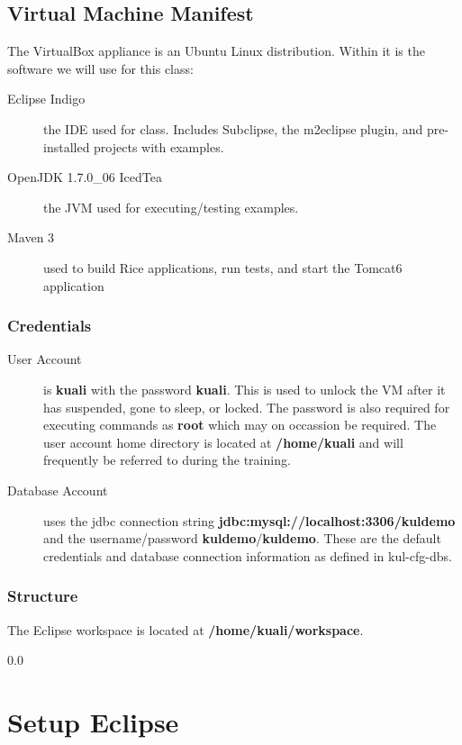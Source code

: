 \documentclass[12pt,notitlepage]{article}
\begin{document}
\subsection{Virtual Machine Manifest}
The VirtualBox appliance is an Ubuntu Linux distribution. Within it is
the software we will use for this class:
\begin{description}
  \item [Eclipse Indigo] the IDE used for class. Includes Subclipse,
    the m2eclipse plugin, and pre-installed projects with examples.
  \item [OpenJDK 1.7.0\_06 IcedTea] the JVM used for executing/testing
    examples.
  \item [Maven 3] used to build Rice applications, run tests, and
    start the Tomcat6 application
\end{description}

\subsubsection{Credentials}
\begin{description}
\item [User Account] is \textbf{kuali} with the password
  \textbf{kuali}. This is used to unlock the VM after it has suspended,
  gone to sleep, or locked. The password is also required for
  executing commands as \textbf{root} which may on occassion be
  required. The user account home directory is located at
  \textbf{/home/kuali} and will frequently be referred to during the training.
\item [Database Account] uses the jdbc connection string
  \textbf{jdbc:mysql://localhost:3306/kuldemo} and the
  username/password \textbf{kuldemo}/\textbf{kuldemo}. These are the
  default credentials and database connection information as defined
  in kul-cfg-dbs.
\end{description}

\subsubsection{Structure}
The Eclipse workspace is located at \textbf{/home/kuali/workspace}. 

{\setlength{\baselineskip}%
  {0.0\baselineskip}
  \section*{\flushright Setup Eclipse}
  \hrulefill \par}
\end{document}
